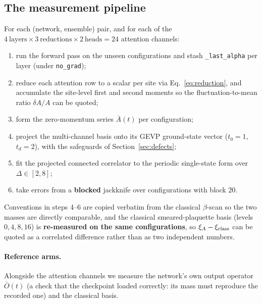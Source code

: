 \documentclass[11pt,a4paper]{article}
\newcommand{\Obar}{\bar{O}}
\newcommand{\Abar}{\bar{A}}
\newcommand{\xiA}{\xi_A}
\begin{document}
\subsection{The measurement pipeline}
\label{sec:pipeline}

For each (network, ensemble) pair, and for each of the $4\ \text{layers} \times
3\ \text{reductions} \times 2\ \text{heads} = 24$ attention channels:

\begin{enumerate}
  \item run the forward pass on the unseen configurations and stash
        \texttt{\_last\_alpha} per layer (under \texttt{no\_grad});
  \item reduce each attention row to a scalar per site via
        Eq.~\eqref{eq:reduction}, and accumulate the site-level first and second
        moments so the fluctuation-to-mean ratio $\delta A/A$ can be quoted;
  \item form the zero-momentum series $\Abar(t)$ per configuration;
  \item project the multi-channel basis onto its GEVP ground-state vector
        ($t_0=1$, $t_d=2$), with the safeguards of
        Section~\ref{sec:defects};
  \item fit the projected connected correlator to the periodic single-state
        form over $\Delta\in[2,8]$;
  \item take errors from a \textbf{blocked} jackknife over configurations with
        block $20$.
\end{enumerate}

Conventions in steps 4--6 are copied verbatim from the classical
$\beta$-scan so the two masses are directly comparable, and the classical
smeared-plaquette basis (levels $0,4,8,16$) is \textbf{re-measured on the same
configurations}, so $\xiA - \xi_{\rm class}$ can be quoted as a correlated
difference rather than as two independent numbers.

\paragraph{Reference arms.} Alongside the attention channels we measure the
network's own output operator $\Obar(t)$ (a check that the checkpoint loaded
correctly: its mass must reproduce the recorded one) and the classical basis.
\end{document}
